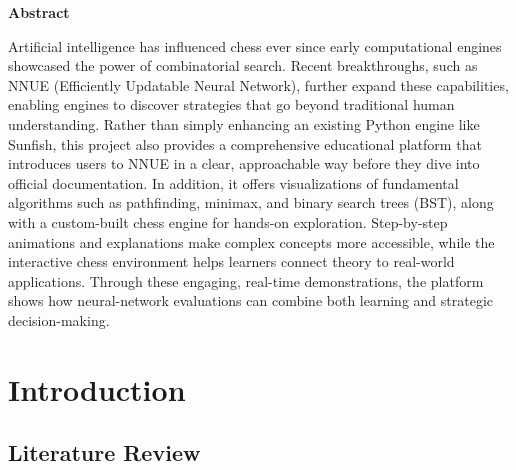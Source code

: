 \documentclass[12pt,a4paper]{article}
\begin{document}
  



\tableofcontents

\newpage
{}
{}

\begin{center}
    \LARGE \bfseries Abstract
\end{center}

\begin{center}
    \parbox{0.9\textwidth}{
         Artificial intelligence has influenced chess ever since early computational engines showcased the power of combinatorial search. Recent breakthroughs, such as NNUE (Efficiently Updatable Neural Network), further expand these capabilities, enabling engines to discover strategies that go beyond traditional human understanding. Rather than simply enhancing an existing Python engine like Sunfish, this project also provides a comprehensive educational platform that introduces users to NNUE in a clear, approachable way before they dive into official documentation. In addition, it offers visualizations of fundamental algorithms such as pathfinding, minimax, and binary search trees (BST), along with a custom-built chess engine for hands-on exploration. Step-by-step animations and explanations make complex concepts more accessible, while the interactive chess environment helps learners connect theory to real-world applications. Through these engaging, real-time demonstrations, the platform shows how neural-network evaluations can combine both learning and strategic decision-making.
    }
\end{center}


\section{Introduction}
\label{sec:intro}


\subsection{Literature Review}
\label{sec:lit_review}
\end{document}
